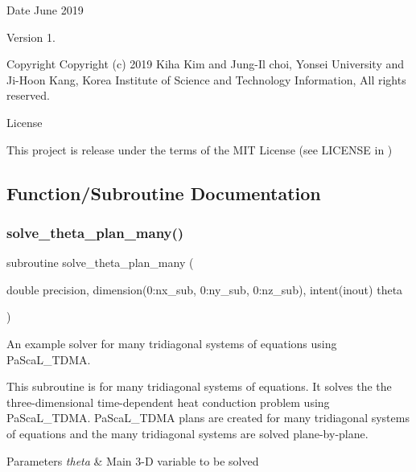 \begin{DoxyDate}{Date}
June 2019 
\end{DoxyDate}
\begin{DoxyVersion}{Version}
1. 
\end{DoxyVersion}
\begin{DoxyParagraph}{Copyright}
Copyright (c) 2019 Kiha Kim and Jung-\/\+Il choi, Yonsei University and Ji-\/\+Hoon Kang, Korea Institute of Science and Technology Information, All rights reserved. 
\end{DoxyParagraph}
\begin{DoxyParagraph}{License }

\end{DoxyParagraph}
This project is release under the terms of the M\+IT License (see L\+I\+C\+E\+N\+SE in ) 

\subsection{Function/\+Subroutine Documentation}
\mbox{\label{solve__theta__plan__many_8f90_af048018fcdfbe66e00922dee3e7e9a64}} 
\subsubsection{\texorpdfstring{solve\_theta\_plan\_many()}{solve\_theta\_plan\_many()}}
{\footnotesize\ttfamily subroutine solve\+\_\+theta\+\_\+plan\+\_\+many (\begin{DoxyParamCaption}\item[{double precision, dimension(0\+:nx\+\_\+sub, 0\+:ny\+\_\+sub, 0\+:nz\+\_\+sub), intent(inout)}]{theta }\end{DoxyParamCaption})}



An example solver for many tridiagonal systems of equations using Pa\+Sca\+L\+\_\+\+T\+D\+MA. 

This subroutine is for many tridiagonal systems of equations. It solves the the three-\/dimensional time-\/dependent heat conduction problem using Pa\+Sca\+L\+\_\+\+T\+D\+MA. Pa\+Sca\+L\+\_\+\+T\+D\+MA plans are created for many tridiagonal systems of equations and the many tridiagonal systems are solved plane-\/by-\/plane. 
\begin{DoxyParams}{Parameters}
{\em theta} & Main 3-\/D variable to be solved \\
\hline
\end{DoxyParams}



